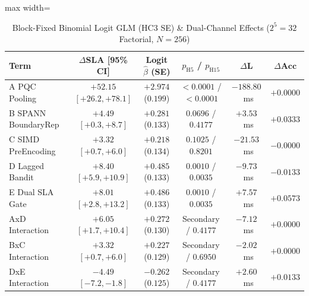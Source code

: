 \documentclass[10pt,journal,compsoc]{IEEEtran}
\begin{document}
\begin{table}[!t]
\centering
\caption{Block-Fixed Binomial Logit GLM (HC3 SE) \& Dual-Channel Effects ($2^5=32$ Factorial, $N=256$)}
\label{tab:glm}
\setlength{\tabcolsep}{2.2pt}
\renewcommand{\arraystretch}{1.06}
\begin{adjustbox}{max width=\columnwidth}
\begin{tabular}{@{}lccccc@{}}
\toprule
\textbf{Term} & $\Delta$\textbf{SLA [95\% CI]} & \textbf{Logit $\hat{\beta}$ (SE)} & $p_{\mathrm{H5}}$ / $p_{\mathrm{H15}}$ & $\Delta\mathbf{L}$ & $\Delta\mathbf{Acc}$ \\
\midrule
A PQC Pooling & $+52.15$ $[+26.2, +78.1]$ & $+2.974$ ($0.199$) & $<0.0001$ / $<0.0001$ & $-188.80$~ms & $+0.0000$ \\
B SPANN BoundaryRep & $+4.49$ $[+0.3, +8.7]$ & $+0.281$ ($0.133$) & $0.0696$ / $0.4177$ & $+3.53$~ms & $+0.0333$ \\
C SIMD PreEncoding & $+3.32$ $[+0.7, +6.0]$ & $+0.218$ ($0.134$) & $0.1025$ / $0.8201$ & $-21.53$~ms & $-0.0000$ \\
D Lagged Bandit & $+8.40$ $[+5.9, +10.9]$ & $+0.485$ ($0.133$) & $0.0010$ / $0.0035$ & $-9.73$~ms & $-0.0133$ \\
E Dual SLA Gate & $+8.01$ $[+2.8, +13.2]$ & $+0.486$ ($0.133$) & $0.0010$ / $0.0035$ & $+7.57$~ms & $+0.0573$ \\
AxD Interaction & $+6.05$ $[+1.7, +10.4]$ & $+0.272$ ($0.130$) & Secondary / $0.4177$ & $-7.12$~ms & $+0.0000$ \\
BxC Interaction & $+3.32$ $[+0.7, +6.0]$ & $+0.227$ ($0.129$) & Secondary / $0.6950$ & $-2.02$~ms & $+0.0000$ \\
DxE Interaction & $-4.49$ $[-7.2, -1.8]$ & $-0.262$ ($0.125$) & Secondary / $0.4177$ & $+2.60$~ms & $+0.0133$ \\
\bottomrule
\end{tabular}
\end{adjustbox}
\end{table}
\end{document}
